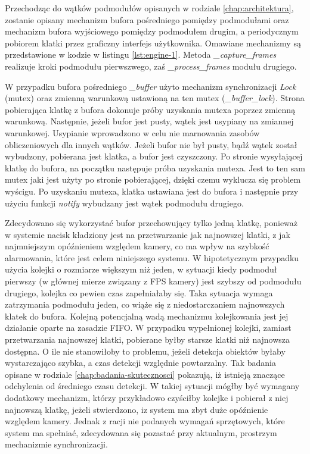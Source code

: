 Przechodząc do wątków podmodułów opisanych w rodziale \ref{chap:architektura}, zostanie opisany mechanizm bufora pośredniego pomiędzy podmodułami oraz mechanizm bufora wyjściowego pomiędzy podmodułem drugim, a periodycznym pobiorem klatki przez graficzny interfejs użytkownika. Omawiane mechanizmy są przedstawione w kodzie w listingu \ref{lst:engine-1}. Metoda \emph{\_capture\_frames} realizuje kroki podmodułu pierwszwego, zaś \emph{\_process\_frames} modułu drugiego.

W przypadku bufora pośredniego \emph{\_buffer} użyto mechanizm synchronizacji \emph{Lock} (mutex) oraz zmienną warunkową ustawioną na ten mutex (\emph{\_buffer\_lock}). Strona pobierająca klatkę z bufora dokonuje próby uzyskania mutexa poprzez zmienną warunkową. Następnie, jeżeli bufor jest pusty, wątek jest usypiany na zmiannej warunkowej. Usypianie wprowadzono w celu nie marnowania zasobów obliczeniowych dla innych wątków. Jeżeli bufor nie był pusty, bądź wątek został wybudzony, pobierana jest klatka, a bufor jest czyszczony. 
Po stronie wysyłającej klatkę do bufora, na początku następuje próba uzyskania mutexa. Jest to ten sam mutex jaki jest użyty po stronie pobierającej, dzięki czemu wyklucza się problem wyścigu. Po uzyskaniu mutexa, klatka ustawiana jest do bufora i następnie przy użyciu funkcji \emph{notify} wybudzany jest wątek podmodułu drugiego. 

Zdecydowano się wykorzystać bufor przechowujący tylko jedną klatkę, ponieważ w systemie nacisk kładziony jest na przetwarzanie jak najnowszej klatki, z jak najmniejszym opóźnieniem względem kamery, co ma wpływ na szybkość alarmowania, które jest celem niniejszego systemu.
W hipotetycznym przypadku użycia kolejki o rozmiarze większym niż jeden, w sytuacji kiedy podmoduł pierwszy (w głównej mierze związany z FPS kamery) jest szybszy od podmodułu drugiego, kolejka co pewien czas zapełniałaby się. Taka sytuacja wymaga zatrzymania podmodułu jeden, co wiąże się z niedostarczaniem najnowszych klatek do bufora. Kolejną potencjalną wadą mechanizmu kolejkowania jest jej działanie oparte na zasadzie FIFO. W przypadku wypełnionej kolejki, zamiast przetwarzania najnowszej klatki, pobierane byłby starsze klatki niż najnowsza dostępna. O ile nie stanowiłoby to problemu, jeżeli detekcja obiektów byłaby wystarczająco szybka, a czas detekcji względnie powtarzalny. Tak badania opisane w rodziale \ref{chap:badania-skutecznosci} pokazują, iż istnieją znaczące odchylenia od średniego czasu detekcji. W takiej sytuacji mógłby być wymagany dodatkowy mechanizm, którzy przykładowo czyściłby kolejke i pobierał z niej najnowszą klatkę, jeżeli stwierdzono, iz system ma zbyt duże opóźnienie względem kamery. Jednak z racji nie podanych wymagań sprzętowych, które system ma spełniać, zdecydowana się pozastać przy aktualnym, prostrzym mechanizmie synchronizacji.

